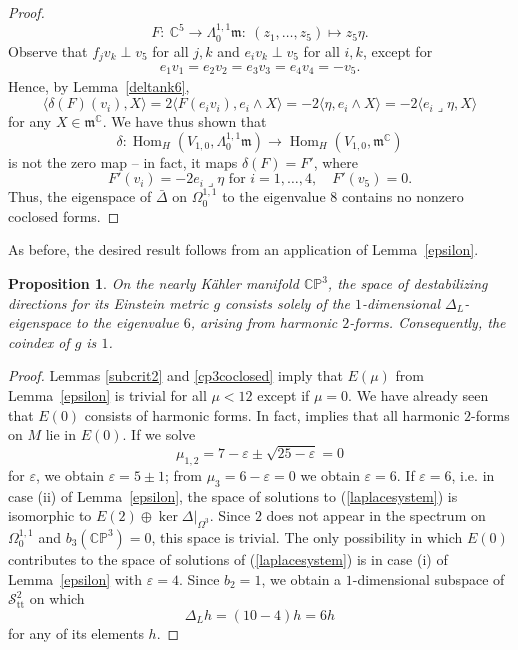 \documentclass[12pt]{scrartcl}
\theoremstyle{plain}
\newtheorem{prop}[satz]{Proposition}
\theoremstyle{definition}
\newcommand{\C}{\mathbb{C}}%
\newcommand{\CP}{\mathbb{CP}}%
\newcommand{\Hom}{\operatorname{Hom}}%
\renewcommand{\S}{\mathscr{S}}%
\newcommand{\m}{\mathfrak{m}}%
\newcommand{\TT}{\S^2_{\mathrm{tt}}}%
\begin{document}
\begin{proof}
\[F:\ \C^5\to\Lambda^{1,1}_0\m:\ (z_1,\ldots,z_5)\mapsto z_5\eta.\]
Observe that $f_jv_k\perp v_5$ for all $j,k$ and $e_iv_k\perp v_5$ for all $i,k$, except for
\begin{align*}
e_1v_1=e_2v_2=e_3v_3=e_4v_4=-v_5.
\end{align*}
Hence, by Lemma~\ref{deltank6},
\[\langle\delta(F)(v_i),X\rangle=2\langle F(e_iv_i),e_i\wedge X\rangle=-2\langle\eta,e_i\wedge X\rangle=-2\langle e_i\lrcorner\eta,X\rangle\]
for any $X\in\m^\C$. We have thus shown that
\[\delta: \Hom_H(V_{1,0},\Lambda^{1,1}_0\m)\to\Hom_H(V_{1,0},\m^\C)\]
is not the zero map -- in fact, it maps $\delta(F)=F'$, where
\[F'(v_i)=-2e_i\lrcorner\eta\text{ for }i=1,\ldots,4,\quad F'(v_5)=0.\]
Thus, the eigenspace of $\bar\Delta$ on $\Omega^{1,1}_0$ to the eigenvalue $8$ contains no nonzero coclosed forms.
\end{proof}

\noindent
As before, the desired result follows from an application of Lemma~\ref{epsilon}.

\begin{prop}\label{cp3prop}
  On the nearly Kähler manifold $\CP^3$, the space of destabilizing directions for its Einstein metric $g$ consists solely of the $1$-dimensional $\Delta_L$-eigenspace to the eigenvalue $6$, arising from harmonic $2$-forms. Consequently, the coindex of $g$ is $1$.
\end{prop}
\begin{proof}
Lemmas \ref{subcrit2} and \ref{cp3coclosed} imply that $E(\mu)$ from Lemma~\ref{epsilon} is trivial for all $\mu<12$ except if $\mu=0$. We have already seen that $E(0)$ consists of harmonic forms. In fact, \cite[Thm.~6.2]{verbitsky} implies that all harmonic $2$-forms on $M$ lie in $E(0)$. If we solve
\[\mu_{1,2}=7-\varepsilon\pm\sqrt{25-\varepsilon}=0\]
for $\varepsilon$, we obtain $\varepsilon=5\pm 1$; from $\mu_3=6-\varepsilon=0$ we obtain $\varepsilon=6$. If $\varepsilon=6$, i.e. in case (ii) of Lemma~\ref{epsilon}, the space of solutions to (\ref{laplacesystem}) is isomorphic to $E(2)\oplus\ker\Delta\big|_{\Omega^3}$. Since $2$ does not appear in the spectrum on $\Omega^{1,1}_0$ and $b_3(\CP^3)=0$, this space is trivial. The only possibility in which $E(0)$ contributes to the space of solutions of (\ref{laplacesystem}) is in case (i) of Lemma~\ref{epsilon} with $\varepsilon=4$. Since $b_2=1$, we obtain a $1$-dimensional subspace of $\TT$ on which
\[\Delta_Lh=(10-4)h=6h\]
for any of its elements $h$.
\end{proof}
\end{document}
